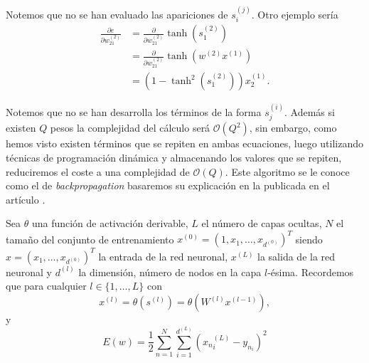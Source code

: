 Notemos que no se han evaluado las apariciones de $s_i^{(j)}$.
Otro ejemplo sería
\begin{align}
    \frac{\partial e}{\partial w^{(2)}_{21}} 
    &=
    \frac{\partial }{\partial w^{(2)}_{21}}
         \tanh \left(s^{(2)}_{1}\right)
    \\
    &= 
    \frac{\partial }{\partial w^{(2)}_{21}}
         \tanh \left(w^{(2)}x^{(1)}\right)
    \\
    &= \left(
    1- \tanh^2 \left(s^{(2)}_{1}\right) \right)x^{(1)}_2.
\end{align}

Notemos que no se han desarrolla los términos de la forma $s^{(i)}_j$. Además si existen $Q$ pesos la complejidad del cálculo será $\mathcal{O}(Q^2)$, sin embargo, como hemos visto existen términos que se repiten en ambas ecuaciones, luego utilizando técnicas de 
programación dinámica y almacenando los valores que se repiten, 
reduciremos el coste a una complejidad de $\mathcal{O}(Q).$ Este 
algoritmo se le conoce como el de \textit{backpropagation}
basaremos su explicación en la publicada en
el artículo \cite{backpropagation-Hinton}.


Sea $\theta$ una función de activación derivable, 
 $L$ el número de capas ocultas, $N$ el tamaño del conjunto de entrenamiento $x^{(0)} = (1, x_1, \ldots, x_{d^{(0)}})^T$ 
siendo $x = (x_1, \ldots, x_{d^{(0)}})^T$ la entrada de la red neuronal, $x^{(L)}$ la salida de la red neuronal y 
$d^{(l)}$ la dimensión, número de nodos en la capa $l$-ésima. 
Recordemos que 
para cualquier $l \in \{1, \ldots, L\}$ con
\begin{equation}
    x^{(l)}
     = 
     \theta \left( s^{(l)}\right) 
     = 
     \theta \left( W^{(l)} x^{(l-1)}\right),
\end{equation}
y
\begin{equation}
    E(w) = \frac{1}{2} 
    \sum_{n = 1}^{N}
    \sum_{i = 1}^{d^{(L)}}
    \left({x_n}^{(L)}_i-y_{n_i} \right)^2
\end{equation}

